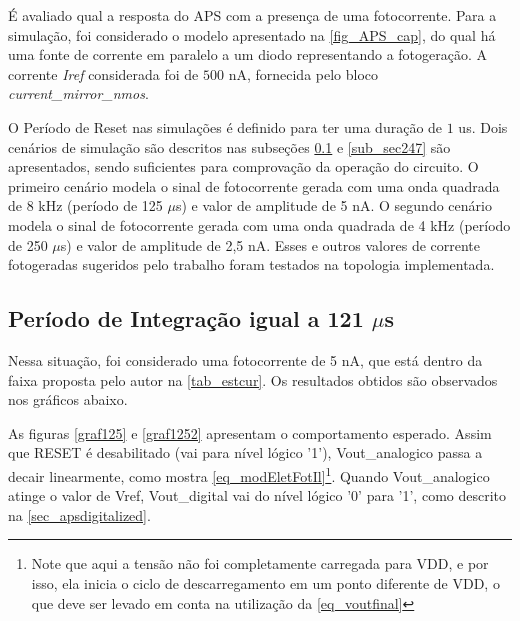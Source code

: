 É avaliado qual a resposta do APS com a presença de uma fotocorrente. Para a simulação, foi considerado o modelo apresentado na \autoref{fig_APS_cap}, do qual há uma fonte de corrente em paralelo a um diodo representando a fotogeração. A corrente \textit{Iref} considerada foi de $500$ nA, fornecida pelo bloco \textit{current\_mirror\_nmos}.

O Período de Reset nas simulações é definido para ter uma duração de $1$ us. Dois cenários de simulação são descritos nas subseções \ref{sub_sec121} e \ref{sub_sec247} são apresentados, sendo suficientes para comprovação da operação do circuito. O primeiro cenário modela o sinal de fotocorrente gerada com uma onda quadrada de 8 kHz (período de 125 $\mu$s) e valor de amplitude de 5 nA. O segundo cenário modela o sinal de fotocorrente gerada com uma onda quadrada de 4 kHz (período de 250 $\mu$s) e valor de amplitude de 2,5 nA. Esses e outros valores de corrente fotogeradas sugeridos pelo trabalho \cite{LidianeCampos} foram testados na topologia implementada.

\subsection{Período de Integração igual a 121 $\mu$s}
\label{sub_sec121}

Nessa situação, foi considerado uma fotocorrente de 5 nA, que está dentro da faixa proposta pelo autor na \autoref{tab_estcur}. Os resultados obtidos são observados nos gráficos abaixo.

As figuras \ref{graf125} e \ref{graf1252} apresentam o comportamento esperado. Assim que RESET é desabilitado (vai para nível lógico '1'), Vout\_analogico passa a decair linearmente, como mostra \autoref{eq_modEletFotIl}\footnote{Note que aqui a tensão não foi completamente carregada para VDD, e por isso, ela inicia o ciclo de descarregamento em um ponto diferente de VDD, o que deve ser levado em conta na utilização da \autoref{eq_voutfinal}}. Quando Vout\_analogico atinge o valor de Vref, Vout\_digital vai do nível lógico '0' para '1', como descrito na \autoref{sec_apsdigitalized}.

